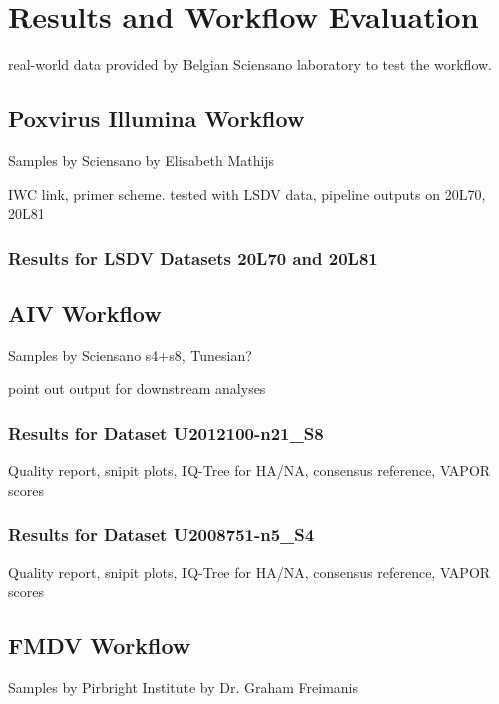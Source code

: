 \chapter{Results and Workflow Evaluation}\label{chap:results}

real-world data provided by Belgian Sciensano laboratory to test the workflow.

\section{Poxvirus Illumina Workflow}
Samples by Sciensano by Elisabeth Mathijs

IWC link, primer scheme.
tested with LSDV data,
pipeline outputs on 20L70, 20L81

\subsection{Results for LSDV Datasets 20L70 and 20L81}

\section{AIV Workflow}
Samples by Sciensano s4+s8, Tunesian?

point out output for downstream analyses

\subsection{Results for Dataset U2012100-n21\_S8} %
Quality report, snipit plots, IQ-Tree for HA/NA, consensus reference, VAPOR scores

\subsection{Results for Dataset U2008751-n5\_S4}
Quality report, snipit plots, IQ-Tree for HA/NA, consensus reference, VAPOR scores

\section{FMDV Workflow}
Samples by Pirbright Institute by Dr. Graham Freimanis